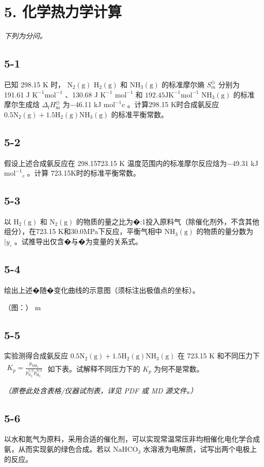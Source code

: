 \section*{5. 化学热力学计算}
\textit{下列为分问。}

\subsection*{5-1}
已知 298.15 K 时， $\mathrm { N } _ { 2 } ( \mathrm { g } )$ $\mathrm { H } _ { 2 } ( \mathrm { g } )$ 和 $\mathrm { { N H _ { 3 } ( g ) } }$ 的标准摩尔熵 $S _ { m } ^ { \ominus }$ 分别为 191.61 J $\mathrm { K ^ { - 1 } m o l ^ { - 1 } }$ 、130.68 J $\mathrm { K } ^ { - 1 }$ $\mathrm { m o l ^ { - 1 } }$ 和 $1 9 2 . 4 5 \mathrm { J } \mathrm { K } ^ { - 1 } \mathrm { m o l } ^ { - 1 }$ $\mathrm { { N H _ { 3 } ( g ) } }$ 的标准摩尔⽣成焓 $\Delta _ { \mathrm { f } } H _ { \mathrm { m } } ^ { \ominus }$ 为−46.11 kJ $\mathrm { m o l ^ { - 1 } c }$ 。计算298.15 K时合成氨反应$0 . 5 \mathrm { N } _ { 2 } ( \mathrm { g } ) + 1 . 5 \mathrm { H } _ { 2 } ( \mathrm { g } )  \mathrm { N H } _ { 3 } ( \mathrm { g } )$ 的标准平衡常数。

\subsection*{5-2}
假设上述合成氨反应在 298.15\~723.15 K 温度范围内的标准摩尔反应焓为−49.31 kJ $\mathrm { m o l ^ { - 1 } } _ { c }$ 。计算 723.15K时的标准平衡常数。

\subsection*{5-3}
以 $\mathrm { H } _ { 2 } ( \mathrm { g } )$ 和 $\mathrm { N } _ { 2 } ( \mathrm { g } )$ 的物质的量之⽐为�:1投⼊原料⽓（除催化剂外，不含其他组分），在723.15 K和30.0MPa下反应，平衡⽓相中 $\mathrm { N H } _ { 3 } ( \mathrm { g } )$ 的物质的量分数为 $| y _ { \circ }$ 。试推导出仅含�与�为变量的关系式。

\subsection*{5-4}
绘出上述�随�变化曲线的⽰意图（须标注出极值点的坐标）。

（图：）
m

\subsection*{5-5}
实验测得合成氨反应 $0 . 5 \mathrm { N } _ { 2 } ( \mathrm { g } ) + 1 . 5 \mathrm { H } _ { 2 } ( \mathrm { g } )  \mathrm { N H } _ { 3 } ( \mathrm { g } )$ 在 723.15 K 和不同压⼒下 $\begin{array} { r } { K _ { p } = \frac { p _ { \mathrm { N H _ { 3 } } } } { p _ { \mathrm { N _ { 2 } } } ^ { 1 / 2 } p _ { \mathrm { H _ { 2 } } } ^ { 3 / 2 } } } \end{array}$ 如下表。试解释不同压⼒下的 $K _ { p }$ 为何不是常数。

\textit{（原卷此处含表格/仪器试剂表，详见 PDF 或 MD 源文件。）}

\subsection*{5-6}
以⽔和氮⽓为原料，采⽤合适的催化剂，可以实现常温常压⾮均相催化电化学合成氨，从⽽实现氨的绿⾊合成。若以 $\mathrm { N a H C O _ { 3 } }$ ⽔溶液为电解质，试写出两个电极上的反应。
